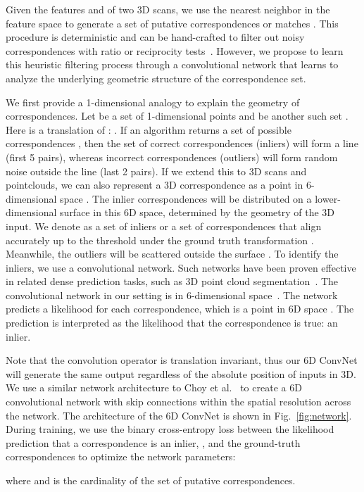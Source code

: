 \documentclass[10pt,twocolumn,letterpaper]{article}
\begin{document}
Given the features  and  of two 3D scans, we use the nearest neighbor in the feature space to generate a set of putative correspondences or matches .
This procedure is deterministic and can be hand-crafted to filter out noisy correspondences with ratio or reciprocity tests~\cite{zhou2016eccv}.
However, we propose to learn this heuristic filtering process through a convolutional network that learns to analyze the underlying geometric structure of the correspondence set.


We first provide a 1-dimensional analogy to explain the geometry of correspondences.
Let  be a set of 1-dimensional points  and  be another such set . Here  is a translation of : . If an algorithm returns a set of possible correspondences , then the set of correct correspondences (inliers) will form a line (first 5 pairs), whereas incorrect correspondences (outliers) will form random noise outside the line (last 2 pairs).
If we extend this to 3D scans and pointclouds, we can also represent a 3D correspondence  as a point in 6-dimensional space . The inlier correspondences will be distributed on a lower-dimensional surface in this 6D space, determined by the geometry of the 3D input.
We denote  as a set of inliers or a set of correspondences  that align accurately up to the threshold  under the ground truth transformation .
Meanwhile, the outliers  will be scattered outside the surface . To identify the inliers,
we use a convolutional network. Such networks have been proven effective in related dense prediction tasks, such as 3D point cloud segmentation~\cite{Graham2018,choy20194d}.
The convolutional network in our setting is in 6-dimensional space~\cite{choy2020high}. The network predicts a likelihood for each correspondence, which is a point in 6D space . The prediction is interpreted as the likelihood that the correspondence is true: an inlier.

Note that the convolution operator is translation invariant, thus our 6D ConvNet will generate the same output regardless of the absolute position of inputs in 3D. We use a similar network architecture to Choy et al.~\cite{FCGF2019} to create a 6D convolutional network with skip connections within the spatial resolution across the network.
The architecture of the 6D ConvNet is shown in Fig.~\ref{fig:network}.
During training, we use the binary cross-entropy loss between the likelihood prediction that a correspondence  is an inlier, , and the ground-truth correspondences  to optimize the network parameters:

where  and  is the cardinality of the set of putative correspondences.
\end{document}
